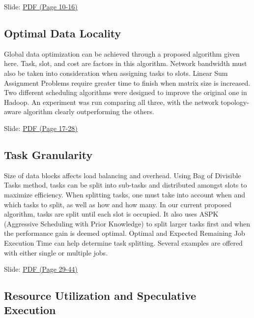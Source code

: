 
  Slide:
  \href{https://drive.google.com/open?id=0B88HKpainTSfT28zLTdKYWhGdGM}{PDF
  (Page 10-16)}

\subsection{Optimal Data Locality}

Global data optimization can be achieved through a proposed algorithm
given here. Task, slot, and cost are factors in this algorithm. Network
bandwidth must also be taken into consideration when assigning tasks to
slots. Linear Sum Assignment Problems require greater time to finish
when matrix size is increased. Two different scheduling algorithms were
designed to improve the original one in Hadoop. An experiment was run
comparing all three, with the network topology-aware algorithm clearly
outperforming the others.


  Slide:
  \href{https://drive.google.com/open?id=0B88HKpainTSfT28zLTdKYWhGdGM}{PDF
  (Page 17-28)}

\subsection{Task Granularity}

Size of data blocks affects load balancing and overhead. Using Bag of
Divisible Tasks method, tasks can be split into sub-tasks and
distributed amongst slots to maximize efficiency. When splitting tasks,
one must take into account when and which tasks to split, as well as how
and how many. In our current proposed algorithm, tasks are split until
each slot is occupied. It also uses ASPK (Aggressive Scheduling with
Prior Knowledge) to split larger tasks first and when the performance
gain is deemed optimal. Optimal and Expected Remaining Job Execution
Time can help determine task splitting. Several examples are offered
with either single or multiple jobs.


  Slide:
  \href{https://drive.google.com/open?id=0B88HKpainTSfT28zLTdKYWhGdGM}{PDF
  (Page 29-44)}

\subsection{Resource Utilization and Speculative Execution}

